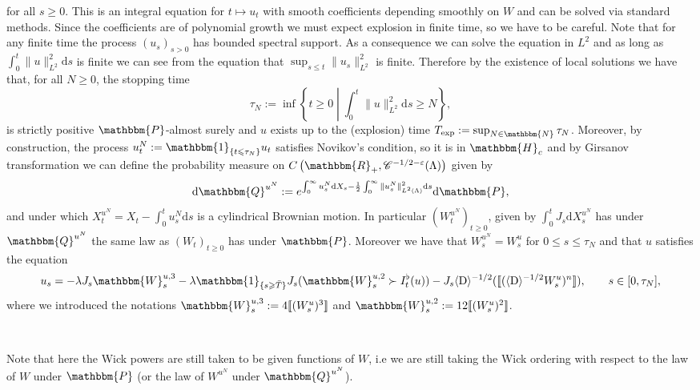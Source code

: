 \documentclass[11pt]{article}
\newcommand{\assign}{:=}
\newcommand{\mathD}{\mathrm{D}}
\newcommand{\mathd}{\mathrm{d}}
\newcommand{\VV}{\mathscr{C}}
\begin{document}
for all $s \geqslant 0$. This is an integral equation for $t \mapsto u_t$ with
smooth coefficients depending smoothly on $W$ and can be solved via standard
methods. Since the coefficients are of polynomial growth we must expect
explosion in finite time, so we have to be careful. Note that for any finite
time the process $(u_s)_{s > 0}$ has bounded spectral support. As a
consequence we can solve the equation in $L^2$ and as long as $\int^t_0 \| u
\|^2_{L^2} \mathd s$ is finite we can see from the equation that $\sup_{s
\leqslant t} \| u_s \|^2_{L^2}$ is finite. Therefore by the existence of local
solutions we have that, for all $N \geqslant 0$, the stopping time
\[ \tau_N \assign \inf \left\{ t \geqslant 0 \middle| \int^t_0 \| u \|^2_{L^2}
   \mathd s \geqslant N \right\}, \]
is strictly positive $\mathbbm{P}$-almost surely and $u$ exists up to the
(explosion) time $T_{\exp} \assign \sup_{N \in \mathbbm{N}} \tau_N$. Moreover,
by construction, the process $u_t^N \assign \mathbbm{1}_{\{ t \leqslant \tau_N
\}} u_t$ satisfies Novikov's condition, so it is in $\mathbbm{H}_c$ and by
Girsanov transformation we can define the probability measure on $C \left(
\mathbbm{R}_+, \VV^{- 1 / 2 - \varepsilon} (\Lambda) \right)$ given by
\[ \mathd \mathbbm{Q}^{u^N} \assign e^{\int^{\infty}_0 u_s^N \mathd X_s -
   \frac{1}{2} \int^{\infty}_0 \| u_s^N \|^2_{L^2 (\Lambda)} \mathd s} \mathd
   \mathbbm{P}, \]
and under which $X^{u^N}_t = X_t - \int^t_0 u_s^N \mathd s$ is a cylindrical
Brownian motion. In particular $(W^{u^N}_t)_{t \geqslant 0}$, given by
$\int^t_0 J_s \mathd X^{u^N}_s$ has under $\mathbbm{Q}^{u^N}$ the same law as
$(W_t)_{t \geqslant 0}$ has under $\mathbbm{P}$. Moreover we have that
$W^{u^N}_s = W^u_s$ for $0 \leqslant s \leqslant \tau_N$ and that $u$
satisfies the equation
\begin{equation}
  u_s = - \lambda J_s \mathbbm{W}_s^{u, 3} - \lambda \mathbbm{1}_{\{ s
  \geqslant \bar{T} \}} J_s (\mathbbm{W}_s^{u, 2} \succ I_t^{\flat} (u)) - J_s
  \langle \mathD \rangle^{- 1 / 2} (\llbracket (\langle \mathD \rangle^{- 1 /
  2} W^u_s)^n \rrbracket), \label{eq:drift-uu} \qquad s \in [0, \tau_N],
\end{equation}
where we introduced the notations $\mathbbm{W}_s^{u, 3} \assign 4 \llbracket
(W_s^u)^3 \rrbracket$ and $\mathbbm{W}_s^{u, 2} \assign 12 \llbracket
(W^u_s)^2 \rrbracket$.

\

Note that here the Wick powers are still taken to be given functions of $W$,
i.e we are still taking the Wick ordering with respect to the law of $W$ under
$\mathbbm{P}$ (or the law of $W^{u^N}$ under $\mathbbm{Q}^{u^N}$).
\end{document}
